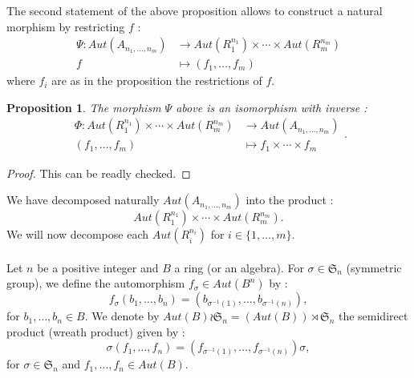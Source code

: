 \documentclass[12pt, reqno]{amsart}
\newtheorem{proposition}[theorem]{Proposition}
\begin{document}
The second statement of the above proposition allows to construct a natural morphism by restricting $f$ :
$$
  \begin{aligned}
    {\Psi} : Aut(A_{n_1,\dots,n_m}) & \longrightarrow Aut(R_1^{n_1})\times \cdots \times Aut(R_m^{n_m})  \\ 
    f & \longmapsto (f_1,\dots,f_m)
  \end{aligned}
 $$
where $f_i$ are as in the proposition the restrictions of $f$.

\begin{proposition}\label{Psi}
The morphism $\Psi$ above is an isomorphism with inverse : 
 $$
  \begin{aligned}
    {\Phi} :Aut(R_1^{n_1})\times \cdots \times Aut(R_m^{n_m}) & \longrightarrow Aut(A_{n_1,\dots,n_m})  \\
     (f_1,\dots,f_m) & \longmapsto f_1\times \cdots \times f_m
  \end{aligned}.
 $$

\end{proposition}
\begin{proof}
This can be readly checked.
\end{proof} 
 
We have decomposed naturally $Aut(A_{n_1,\dots,n_m}) $ into the product : 
$$ Aut(R_1^{n_1})\times \cdots \times Aut(R_m^{n_m}).$$
We will now decompose each $Aut(R_i^{n_i})$ for $i\in \{1,\dots,m\}$.\\\\
Let $n$ be a positive integer and $B$ a ring (or an algebra). For $\sigma \in \mathfrak{S}_n$  (symmetric group), we define the automorphism $f_\sigma \in Aut(B^n)$ by :
$$ f_\sigma(b_1,\dots,b_n)=(b_{\sigma^{-1}(1)}, \dots, b_{\sigma^{-1}(n)}),$$
for $b_1,\dots,b_n \in B$. We denote by $Aut(B) \wr\mathfrak{S}_n=(Aut(B))\rtimes \mathfrak{S}_n$ the semidirect product (wreath product) given by : 
$$ \sigma (f_1,\dots,f_n) =(f_{\sigma^{-1}(1)}, \dots, f_{\sigma^{-1}(n)})\sigma,$$
for $\sigma \in \mathfrak{S}_n$ and $f_1,\dots,f_n\in Aut(B)$.
\end{document}
